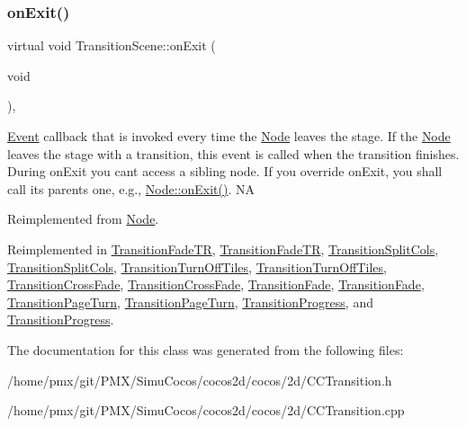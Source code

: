\mbox{\label{classTransitionScene_a05f91bf82d41da86e4a12af07f8242e2}} 
\subsubsection{\texorpdfstring{on\+Exit()}{onExit()}\hspace{0.1cm}{\footnotesize\ttfamily [2/2]}}
{\footnotesize\ttfamily virtual void Transition\+Scene\+::on\+Exit (\begin{DoxyParamCaption}\item[{void}]{ }\end{DoxyParamCaption})\hspace{0.3cm}{\ttfamily [override]}, {\ttfamily [virtual]}}

\hyperlink{classEvent}{Event} callback that is invoked every time the \hyperlink{classNode}{Node} leaves the \textquotesingle{}stage\textquotesingle{}. If the \hyperlink{classNode}{Node} leaves the \textquotesingle{}stage\textquotesingle{} with a transition, this event is called when the transition finishes. During on\+Exit you can\textquotesingle{}t access a sibling node. If you override on\+Exit, you shall call its parent\textquotesingle{}s one, e.\+g., \hyperlink{classNode_ac83de835ea315e3179d4293acd8903ac}{Node\+::on\+Exit()}.  NA 

Reimplemented from \hyperlink{classNode_ac83de835ea315e3179d4293acd8903ac}{Node}.



Reimplemented in \hyperlink{classTransitionFadeTR_a9460b2272ddd276f68727429474b6862}{Transition\+Fade\+TR}, \hyperlink{classTransitionFadeTR_a62a984bd87eb2090da0e542e5ce91cce}{Transition\+Fade\+TR}, \hyperlink{classTransitionSplitCols_aaf1b4e4345002bda3404ae89e10d5fe1}{Transition\+Split\+Cols}, \hyperlink{classTransitionSplitCols_af083146c10d56bb5342ae286c2967e67}{Transition\+Split\+Cols}, \hyperlink{classTransitionTurnOffTiles_a690a28870ab7e338aa4645134869f520}{Transition\+Turn\+Off\+Tiles}, \hyperlink{classTransitionTurnOffTiles_ad178c23408dd18b341e043ae5d645499}{Transition\+Turn\+Off\+Tiles}, \hyperlink{classTransitionCrossFade_a18832603241957b4c6700b84b7b587e0}{Transition\+Cross\+Fade}, \hyperlink{classTransitionCrossFade_a87aa5397c6cdba91bd477a9df1534730}{Transition\+Cross\+Fade}, \hyperlink{classTransitionFade_a84179a9a978c9ff2e302e913f7d90cc4}{Transition\+Fade}, \hyperlink{classTransitionFade_aa476da6459ad94c3fb3254a261fe3161}{Transition\+Fade}, \hyperlink{classTransitionPageTurn_adf4182d3e59e362c1ca5beec367d7bf9}{Transition\+Page\+Turn}, \hyperlink{classTransitionPageTurn_a5c53ecc8cf81db631e7af1c5fa12d942}{Transition\+Page\+Turn}, \hyperlink{classTransitionProgress_a8682fe8c7c42a31c6796bff2e4e1fef5}{Transition\+Progress}, and \hyperlink{classTransitionProgress_a19b22f6e9a1d4e48d1d4b61e17fec363}{Transition\+Progress}.



The documentation for this class was generated from the following files\+:\begin{DoxyCompactItemize}
\item 
/home/pmx/git/\+P\+M\+X/\+Simu\+Cocos/cocos2d/cocos/2d/C\+C\+Transition.\+h\item 
/home/pmx/git/\+P\+M\+X/\+Simu\+Cocos/cocos2d/cocos/2d/C\+C\+Transition.\+cpp\end{DoxyCompactItemize}
